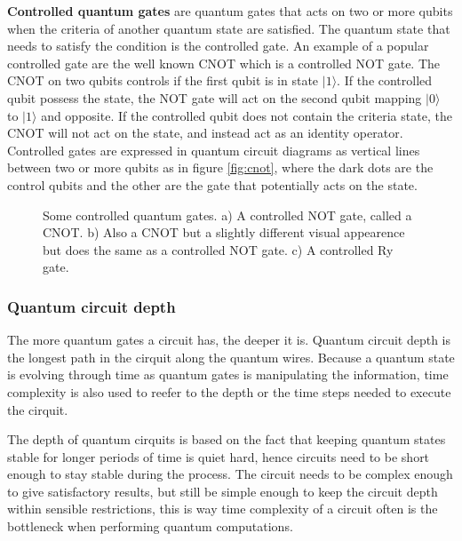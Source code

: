 \documentclass[../main.tex]{subfiles}
\begin{document}
\textbf{Controlled quantum gates} are quantum gates that acts on two or more qubits when the criteria of another quantum state are satisfied. The quantum state that needs to satisfy the condition is the controlled gate. An example of a popular controlled gate are the well known CNOT which is a controlled NOT gate. The CNOT on two qubits controls if the first qubit is in state \ensuremath{|1\rangle}. If the controlled qubit possess the state, the NOT gate will act on the second qubit mapping \ensuremath{|0\rangle} to \ensuremath{|1\rangle} and opposite. If the controlled qubit does not contain the criteria state, the CNOT will not act on the state, and instead act as an identity operator. Controlled gates are expressed in quantum circuit diagrams as vertical lines between two or more qubits as in figure \autoref{fig:cnot}, where the dark dots are the control qubits and the other are the gate that potentially acts on the state.

\begin{figure}[h]
    \centering
    \hspace{15pt}
\hspace{15pt}
    \caption{Some controlled quantum gates. a) A controlled NOT gate, called a CNOT. b) Also a CNOT but a slightly different visual appearence but does the same as a controlled NOT gate. c) A controlled Ry gate.}
    \label{fig:cnot}
\end{figure}

\subsubsection{Quantum circuit depth}
The more quantum gates a circuit has, the deeper it is. Quantum circuit depth is the longest path in the cirquit along the quantum wires. Because a quantum state is evolving through time as quantum gates is manipulating the information, time complexity is also used to reefer to the depth or the time steps needed to execute the cirquit. 

The depth of quantum cirquits is based on the fact that keeping quantum states stable for longer periods of time is quiet hard, hence circuits need to be short enough to stay stable during the process. The circuit needs to be complex enough to give satisfactory results, but still be simple enough to keep the circuit depth within sensible restrictions, this is way time complexity of a circuit often is the bottleneck when performing quantum computations.
\end{document}
